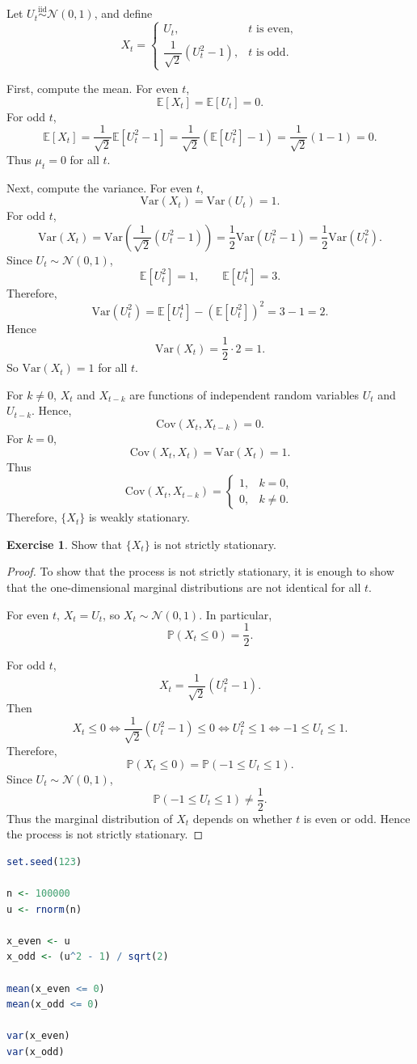 \documentclass[12pt,oneside]{book}
\numberwithin{equation}{section}
\theoremstyle{definition}
\newtheorem{exercise}{Exercise}[section]
\theoremstyle{plain}
\theoremstyle{remark}
\newcommand{\E}{\mathbb{E}}
\newcommand{\Var}{\mathrm{Var}}
\newcommand{\Cov}{\mathrm{Cov}}
\newcommand{\Prob}{\mathbb{P}}
\newcommand{\iid}{\overset{\text{iid}}{\sim}}
\newcommand{\Normal}{\mathcal{N}}
\begin{document}
Let $U_t \iid \Normal(0,1)$, and define
\[
X_t
=
\begin{cases}
U_t, & t \text{ is even},\\
\dfrac{1}{\sqrt{2}}(U_t^2-1), & t \text{ is odd}.
\end{cases}
\]

First, compute the mean. For even $t$,
\[
\E[X_t]=\E[U_t]=0.
\]
For odd $t$,
\[
\E[X_t]
=
\frac{1}{\sqrt{2}}\E[U_t^2-1]
=
\frac{1}{\sqrt{2}}(\E[U_t^2]-1)
=
\frac{1}{\sqrt{2}}(1-1)
=
0.
\]
Thus $\mu_t=0$ for all $t$.

Next, compute the variance. For even $t$,
\[
\Var(X_t)=\Var(U_t)=1.
\]
For odd $t$,
\[
\Var(X_t)
=
\Var\left(\frac{1}{\sqrt{2}}(U_t^2-1)\right)
=
\frac{1}{2}\Var(U_t^2-1)
=
\frac{1}{2}\Var(U_t^2).
\]
Since $U_t\sim \Normal(0,1)$,
\[
\E[U_t^2]=1,
\qquad
\E[U_t^4]=3.
\]
Therefore,
\[
\Var(U_t^2)
=
\E[U_t^4]-(\E[U_t^2])^2
=
3-1
=
2.
\]
Hence
\[
\Var(X_t)=\frac{1}{2}\cdot 2=1.
\]
So $\Var(X_t)=1$ for all $t$.

For $k\neq 0$, $X_t$ and $X_{t-k}$ are functions of independent random variables $U_t$ and $U_{t-k}$. Hence,
\[
\Cov(X_t,X_{t-k})=0.
\]
For $k=0$,
\[
\Cov(X_t,X_t)=\Var(X_t)=1.
\]
Thus
\[
\Cov(X_t,X_{t-k})
=
\begin{cases}
1, & k=0,\\
0, & k\neq 0.
\end{cases}
\]
Therefore, $\{X_t\}$ is weakly stationary.

\begin{exercise}
Show that $\{X_t\}$ is not strictly stationary.
\end{exercise}

\begin{proof}
To show that the process is not strictly stationary, it is enough to show that the one-dimensional marginal distributions are not identical for all $t$.

For even $t$, $X_t=U_t$, so $X_t\sim\Normal(0,1)$. In particular,
\[
\Prob(X_t\leq 0)=\frac{1}{2}.
\]

For odd $t$,
\[
X_t=\frac{1}{\sqrt{2}}(U_t^2-1).
\]
Then
\[
X_t\leq 0
\iff
\frac{1}{\sqrt{2}}(U_t^2-1)\leq 0
\iff
U_t^2\leq 1
\iff
-1\leq U_t\leq 1.
\]
Therefore,
\[
\Prob(X_t\leq 0)
=
\Prob(-1\leq U_t\leq 1).
\]
Since $U_t\sim\Normal(0,1)$,
\[
\Prob(-1\leq U_t\leq 1)\neq \frac{1}{2}.
\]
Thus the marginal distribution of $X_t$ depends on whether $t$ is even or odd. Hence the process is not strictly stationary.
\end{proof}

\begin{lstlisting}[language=R, caption={Checking the different marginal distributions in R}]
set.seed(123)

n <- 100000
u <- rnorm(n)

x_even <- u
x_odd <- (u^2 - 1) / sqrt(2)

mean(x_even <= 0)
mean(x_odd <= 0)

var(x_even)
var(x_odd)
\end{lstlisting}
\end{document}
